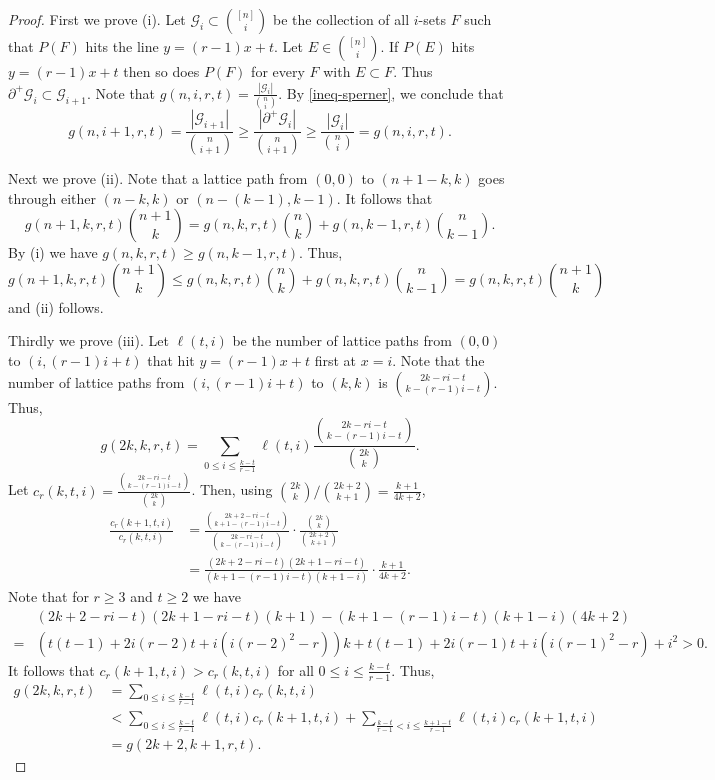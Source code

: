 \documentclass[11pt,a4paper]{article}
\newtheorem{false statement}{False statement}
\theoremstyle{definition}
\def\hg{\mathcal{G}}
\begin{document}
\begin{proof}
First we prove (i).  Let $\hg_i\subset \binom{[n]}{i}$ be the collection of all $i$-sets $F$ such that $P(F)$ hits the line $y=(r-1)x+t$. Let $E\in \binom{[n]}{i}$. 
If  $P(E)$ hits  $y=(r-1)x+t$ then so does $P(F)$ for every $F$ with $E\subset F$. Thus $\partial^+ \hg_i  \subset \hg_{i+1}$. Note that $g(n,i,r,t) = \frac{|\hg_i|}{\binom{n}{i}}$. By \eqref{ineq-sperner}, we conclude that
\[
g(n,i+1,r,t) = \frac{|\hg_{i+1}|}{\binom{n}{i+1}}\geq  \frac{|\partial^+ \hg_i|}{\binom{n}{i+1}}\geq \frac{|\hg_{i}|}{\binom{n}{i}} =g(n,i,r,t).
\]


Next we prove (ii). Note that a lattice path from $(0,0)$ to $(n+1-k,k)$ goes through either  $(n-k,k)$ or $(n-(k-1),k-1)$. It follows that
\[
g(n+1,k,r,t)\binom{n+1}{k} = g(n,k,r,t)\binom{n}{k}+g(n,k-1,r,t)\binom{n}{k-1}.
\]
By (i) we have $g(n,k,r,t)\geq g(n,k-1,r,t)$. Thus,
\[
g(n+1,k,r,t)\binom{n+1}{k} \leq g(n,k,r,t)\binom{n}{k}+g(n,k,r,t)\binom{n}{k-1}= g(n,k,r,t)\binom{n+1}{k}
\]
and (ii) follows.

Thirdly we prove (iii). Let $\ell(t,i)$ be the number of lattice paths from $(0,0)$ to $(i,(r-1)i+t)$ that  hit $y=(r-1)x+t$ first at $x=i$. Note that the number of lattice paths  from $(i,(r-1)i+t)$ to $(k,k)$ is $\binom{2k-ri-t}{k-(r-1)i-t}$. Thus,
\[
g(2k,k,r,t)=\sum_{0\leq i\leq \frac{k-t}{r-1}} \ell(t,i)\frac{\binom{2k-ri-t}{k-(r-1)i-t}}{\binom{2k}{k}}.
\]
Let $c_r(k,t,i) = \frac{\binom{2k-ri-t}{k-(r-1)i-t}}{\binom{2k}{k}}$. Then, using $\binom{2k}{k}/\binom{2k+2}{k+1} =\frac{k+1}{4k+2}$,
\begin{align*}
\frac{c_r(k+1,t,i)}{c_r(k,t,i)} &= \frac{\binom{2k+2-ri-t}{k+1-(r-1)i-t}}{\binom{2k-ri-t}{k-(r-1)i-t}}\cdot
\frac{\binom{2k}{k}}{\binom{2k+2}{k+1}}\\[2pt]
&= \frac{(2k+2-ri-t)(2k+1-ri-t)}{(k+1-(r-1)i-t)(k+1-i)} \cdot \frac{k+1}{4k+2}.
\end{align*}
Note that for $r\geq 3$ and $t\geq 2$ we have
\begin{align*}
&(2k+2-ri-t)(2k+1-ri-t)(k+1)-(k+1-(r-1)i-t)(k+1-i)(4k+2)\\[3pt]
=& \left( t(t-1)+2i(r-2)t+i(i(r-2)^2 - r)\right)k+ t (t - 1)+2 i (r - 1) t+i (i (r - 1)^2 - r) + i^2> 0.
\end{align*}
It follows that $c_r(k+1,t,i)> c_r(k,t,i)$ for all $0\leq i\leq \frac{k-t}{r-1}$. Thus,
\begin{align*}
g(2k,k,r,t) &=\sum_{0\leq i\leq \frac{k-t}{r-1}} \ell(t,i)c_r(k,t,i) \\[3pt]
&< \sum_{0\leq i\leq \frac{k-t}{r-1}} \ell(t,i)c_r(k+1,t,i)+\sum_{\frac{k-t}{r-1}< i\leq \frac{k+1-t}{r-1}} \ell(t,i)c_r(k+1,t,i)\\[3pt]
& =g(2k+2,k+1,r,t).
\end{align*}


\end{proof}
\end{document}
